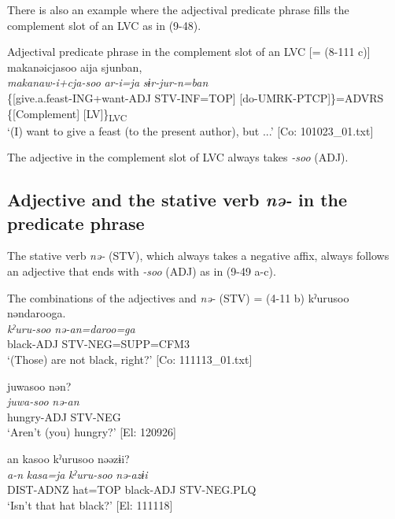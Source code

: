 There is also an example where the adjectival predicate phrase fills the complement slot of an LVC as in (9-48).

\ea   Adjectival predicate phrase in the complement slot of an LVC [= (8-111 c)] \label{ex:9.48}
 \gllll  makanəicjasoo  aija  sjunban,\\
    \textit{makanaw-i+cja-soo}  \textit{ar-i=ja}  \textit{sɨr-jur-n=ban}\\
    \{[give.a.feast-ING+want-ADJ  STV-INF=TOP]  [do-UMRK-PTCP]\}=ADVRS\\
    \{[Complement]    [LV]\}\textsubscript{LVC}\\
    \glt     ‘(I) want to give a feast (to the present author), but ...’ [Co: 101023\_01.txt]
\z

The adjective in the complement slot of LVC always takes \textit{{}-soo} (ADJ).

\subsection{Adjective and the stative verb \textit{nə-} in the predicate phrase}\label{sec:9.2.3}

The stative verb \textit{nə-} (STV), which always takes a negative affix, always follows an adjective that ends with \textit{{}-soo} (ADJ) as in (9-49 a-c).

\ea   The combinations of the adjectives and \textit{nə-} (STV) \label{ex:9.49}
  \ea{} = (4-11 b)
    \glll  kˀurusoo  nəndarooga.\\
      \textit{kˀuru-soo}  \textit{nə-an=daroo=ga}\\
      black-ADJ  STV-NEG=SUPP=CFM3\\
      \glt       ‘(Those) are not black, right?’ [Co: 111113\_01.txt]

\ex\relax [= (4-50 d)]
    \glll  juwasoo  nən?\\
      \textit{juwa-soo}  \textit{nə-an}\\
      hungry-ADJ  STV-NEG\\
      \glt       ‘Aren’t (you) hungry?’ [El: 120926]

\ex\relax [= (8-49 b)]
    \glll  an  kasoo  kˀurusoo  nəəzɨi?\\
      \textit{a-n}  \textit{kasa=ja}  \textit{kˀuru-soo}  \textit{nə-azɨi}\\
      DIST-ADNZ  hat=TOP  black-ADJ  STV-NEG.PLQ\\
      \glt       ‘Isn’t that hat black?’ [El: 111118]
    \z
\z

